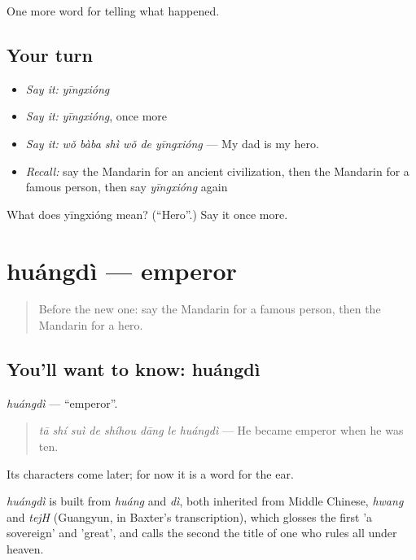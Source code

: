 \begin{grammarlens}[title={What you've built}]
One more word for telling what happened.
\end{grammarlens}

\subsection*{Your turn}
\begin{itemize}
\raggedright
  \item \emph{Say it:} \emph{yīngxióng}
  \item \emph{Say it:} \emph{yīngxióng}, once more
  \item \emph{Say it:} \emph{wǒ bàba shì wǒ de yīngxióng} — My dad is my hero.
  \item \emph{Recall:} say the Mandarin for an ancient civilization, then the Mandarin for a famous person, then say \emph{yīngxióng} again
\end{itemize}

\begin{tcolorbox}[breakable,colback=teal!4,colframe=teal!35!black,title={Before you move on}]
What does yīngxióng mean? (\textquotedblleft{}Hero\textquotedblright{}.) Say it once more.
\end{tcolorbox}
\section[huángdì]{huángdì — emperor}

\label{lesson:ZH-C327-huangdi}



\begin{quote}
Before the new one: say the Mandarin for a famous person, then the Mandarin for a hero.
\end{quote}

\subsection*{You'll want to know: huángdì}
\emph{huángdì} — \textquotedblleft{}emperor\textquotedblright{}.

\begin{quote}
\emph{tā shí suì de shíhou dāng le huángdì} — He became emperor when he was ten.
\end{quote}

Its characters come later; for now it is a word for the ear.

\begin{cousinweb}
\emph{huángdì} is built from \emph{huáng} and \emph{dì}, both inherited from Middle Chinese, \emph{hwang} and \emph{tejH} (Guangyun, in Baxter's transcription), which glosses the first 'a sovereign' and 'great', and calls the second the title of one who rules all under heaven.
\end{cousinweb}

